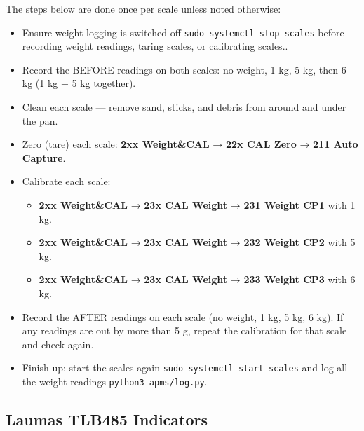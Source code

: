 \documentclass[
  letterpaper,
]{scrbook}
\begin{document}
\begin{tcolorbox}[enhanced jigsaw, left=2mm, toptitle=1mm, breakable, opacitybacktitle=0.6, title=\textcolor{quarto-callout-tip-color}{\faLightbulb}\hspace{0.5em}{Tip}, colback=white, opacityback=0, rightrule=.15mm, leftrule=.75mm, colbacktitle=quarto-callout-tip-color!10!white, bottomtitle=1mm, titlerule=0mm, coltitle=black, colframe=quarto-callout-tip-color-frame, arc=.35mm, bottomrule=.15mm, toprule=.15mm]

The steps below are done once per scale unless noted otherwise:

\begin{itemize}
\item
  Ensure weight logging is switched off
  \texttt{sudo\ systemctl\ stop\ scales} before recording weight
  readings, taring scales, or calibrating scales..
\item
  Record the BEFORE readings on both scales: no weight, 1 kg, 5 kg, then
  6 kg (1 kg + 5 kg together).
\item
  Clean each scale --- remove sand, sticks, and debris from around and
  under the pan.
\item
  Zero (tare) each scale: \textbf{2xx Weight\&CAL} → \textbf{22x CAL
  Zero} → \textbf{211 Auto Capture}.
\item
  Calibrate each scale:

  \begin{itemize}
  \item
    \textbf{2xx Weight\&CAL} → \textbf{23x CAL Weight} → \textbf{231
    Weight CP1} with 1 kg.
  \item
    \textbf{2xx Weight\&CAL} → \textbf{23x CAL Weight} → \textbf{232
    Weight CP2} with 5 kg.
  \item
    \textbf{2xx Weight\&CAL} → \textbf{23x CAL Weight} → \textbf{233
    Weight CP3} with 6 kg.
  \end{itemize}
\item
  Record the AFTER readings on each scale (no weight, 1 kg, 5 kg, 6 kg).
  If any readings are out by more than 5 g, repeat the calibration for
  that scale and check again.
\item
  Finish up: start the scales again
  \texttt{sudo\ systemctl\ start\ scales} and log all the weight
  readings \texttt{python3\ apms/log.py}.
\end{itemize}

\end{tcolorbox}

\subsection{Laumas TLB485 Indicators}\label{laumas-tlb485-indicators}
\end{document}
